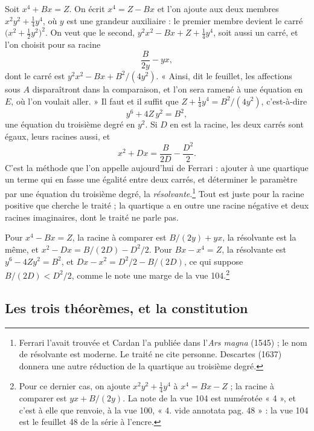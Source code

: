 \documentclass[11pt,a4paper]{article}
\begin{document}
Soit $x^4 + Bx = Z$. On écrit $x^4 = Z - Bx$ et l'on ajoute aux deux membres
$x^2y^2 + \tfrac14 y^4$, où $y$ est une grandeur auxiliaire : le premier membre
devient le carré $\bigl(x^2 + \tfrac12 y^2\bigr)^2$. On veut que le second,
$y^2x^2 - Bx + Z + \tfrac14 y^4$, soit aussi un carré, et l'on choisit pour sa
racine
\[ \frac{B}{2y} - yx , \]
dont le carré est $y^2x^2 - Bx + B^2/(4y^2)$. « Ainsi, dit le feuillet, les
affections sous $A$ disparaîtront dans la comparaison, et l'on sera ramené à une
équation en $E$, où l'on voulait aller. » Il faut et il suffit que
$Z + \tfrac14 y^4 = B^2/(4y^2)$, c'est-à-dire
\[ y^6 + 4Z\,y^2 = B^2 , \]
une équation du troisième degré en $y^2$. Si $D$ en est la racine, les deux
carrés sont égaux, leurs racines aussi, et
\[ x^2 + Dx = \frac{B}{2D} - \frac{D^2}{2} . \]
C'est la méthode que l'on appelle aujourd'hui de Ferrari : ajouter à une
quartique un terme qui en fasse une égalité entre deux carrés, et déterminer le
paramètre par une équation du troisième degré, la \emph{résolvante}.\footnote{Ferrari
l'avait trouvée et Cardan l'a publiée dans l'\emph{Ars magna} (1545) ; le nom de
résolvante est moderne. Le traité ne cite personne. Descartes (1637) donnera une
autre réduction de la quartique au troisième degré.} Tout est juste pour la
racine positive que cherche le traité ; la quartique a en outre une racine
négative et deux racines imaginaires, dont le traité ne parle pas.

Pour $x^4 - Bx = Z$, la racine à comparer est $B/(2y) + yx$, la résolvante est la
même, et $x^2 - Dx = B/(2D) - D^2/2$. Pour $Bx - x^4 = Z$, la résolvante est
$y^6 - 4Zy^2 = B^2$, et $Dx - x^2 = D^2/2 - B/(2D)$, ce qui suppose
$B/(2D) < D^2/2$, comme le note une marge de la vue 104.\footnote{Pour ce dernier
cas, on ajoute $x^2y^2 + \tfrac14y^4$ à $x^4 = Bx - Z$ ; la racine à comparer est
$yx + B/(2y)$. La note de la vue 104 est numérotée « 4 », et c'est à elle que
renvoie, à la vue 100, « 4. vide annotata pag. 48 » : la vue 104 est le
feuillet 48 de la série à l'encre.}

\subsection*{Les trois théorèmes, et la constitution}
\end{document}
